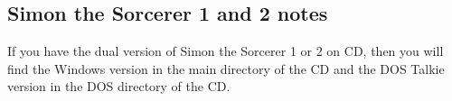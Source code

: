 \subsection{Simon the Sorcerer 1 and 2 notes}
If you have the dual version of Simon the Sorcerer 1 or 2 on CD,
then you will find the Windows version in the main directory of the CD
and the DOS Talkie version in the DOS directory of the CD.
